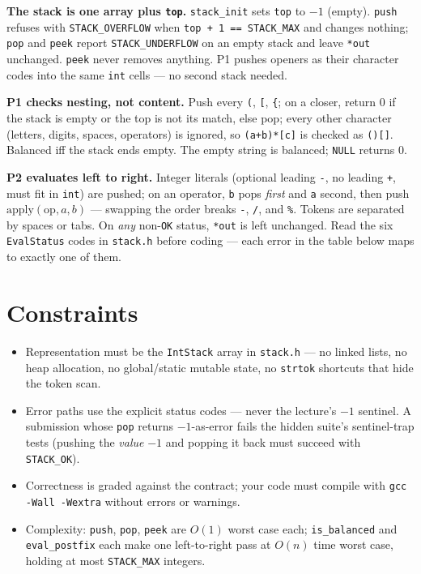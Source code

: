 \documentclass[11pt]{article}
\begin{document}
\textbf{The stack is one array plus \texttt{top}.} \texttt{stack\_init} sets \texttt{top} to $-1$ (empty). \texttt{push} refuses with \texttt{STACK\_OVERFLOW} when \texttt{top + 1 == STACK\_MAX} and changes nothing; \texttt{pop} and \texttt{peek} report \texttt{STACK\_UNDERFLOW} on an empty stack and leave \texttt{*out} unchanged. \texttt{peek} never removes anything. P1 pushes openers as their character codes into the same \texttt{int} cells --- no second stack needed.

\textbf{P1 checks nesting, not content.} Push every \texttt{(}, \texttt{[}, \texttt{\{}; on a closer, return $0$ if the stack is empty or the top is not its match, else pop; every other character (letters, digits, spaces, operators) is ignored, so \texttt{(a+b)*[c]} is checked as \texttt{()[]}. Balanced iff the stack ends empty. The empty string is balanced; \texttt{NULL} returns $0$.

\textbf{P2 evaluates left to right.} Integer literals (optional leading \texttt{-}, no leading \texttt{+}, must fit in \texttt{int}) are pushed; on an operator, \texttt{b} pops \emph{first} and \texttt{a} second, then push $\text{apply}(\text{op}, a, b)$ --- swapping the order breaks \texttt{-}, \texttt{/}, and \texttt{\%}. Tokens are separated by spaces or tabs. On \emph{any} non-\texttt{OK} status, \texttt{*out} is left unchanged. Read the six \texttt{EvalStatus} codes in \texttt{stack.h} before coding --- each error in the table below maps to exactly one of them.

\section{Constraints}

\begin{itemize}
  \item Representation must be the \texttt{IntStack} array in \texttt{stack.h} --- no linked lists, no heap allocation, no global/static mutable state, no \texttt{strtok} shortcuts that hide the token scan.
  \item Error paths use the explicit status codes --- never the lecture's $-1$ sentinel. A submission whose \texttt{pop} returns $-1$-as-error fails the hidden suite's sentinel-trap tests (pushing the \emph{value} $-1$ and popping it back must succeed with \texttt{STACK\_OK}).
  \item Correctness is graded against the contract; your code must compile with \texttt{gcc -Wall -Wextra} without errors or warnings.
  \item Complexity: \texttt{push}, \texttt{pop}, \texttt{peek} are $O(1)$ worst case each; \texttt{is\_balanced} and \texttt{eval\_postfix} each make one left-to-right pass at $O(n)$ time worst case, holding at most \texttt{STACK\_MAX} integers.
\end{itemize}
\end{document}

